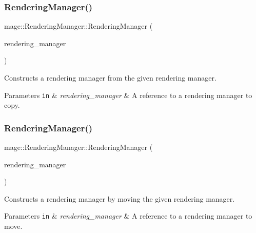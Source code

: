 \subsubsection{\texorpdfstring{Rendering\+Manager()}{RenderingManager()}\hspace{0.1cm}{\footnotesize\ttfamily [2/3]}}
{\footnotesize\ttfamily mage\+::\+Rendering\+Manager\+::\+Rendering\+Manager (\begin{DoxyParamCaption}\item[{const \hyperlink{classmage_1_1_rendering_manager}{Rendering\+Manager} \&}]{rendering\+\_\+manager }\end{DoxyParamCaption})\hspace{0.3cm}{\ttfamily [delete]}}

Constructs a rendering manager from the given rendering manager.


\begin{DoxyParams}[1]{Parameters}
\mbox{\tt in}  & {\em rendering\+\_\+manager} & A reference to a rendering manager to copy. \\
\hline
\end{DoxyParams}
\hypertarget{classmage_1_1_rendering_manager_af3645720626dc0151fdec80097e0364b}{}\label{classmage_1_1_rendering_manager_af3645720626dc0151fdec80097e0364b} 
\subsubsection{\texorpdfstring{Rendering\+Manager()}{RenderingManager()}\hspace{0.1cm}{\footnotesize\ttfamily [3/3]}}
{\footnotesize\ttfamily mage\+::\+Rendering\+Manager\+::\+Rendering\+Manager (\begin{DoxyParamCaption}\item[{\hyperlink{classmage_1_1_rendering_manager}{Rendering\+Manager} \&\&}]{rendering\+\_\+manager }\end{DoxyParamCaption})\hspace{0.3cm}{\ttfamily [default]}}

Constructs a rendering manager by moving the given rendering manager.


\begin{DoxyParams}[1]{Parameters}
\mbox{\tt in}  & {\em rendering\+\_\+manager} & A reference to a rendering manager to move. \\
\hline
\end{DoxyParams}
\hypertarget{classmage_1_1_rendering_manager_a4164e70f014de8d0348c35d5142cedab}{}\label{classmage_1_1_rendering_manager_a4164e70f014de8d0348c35d5142cedab} 
